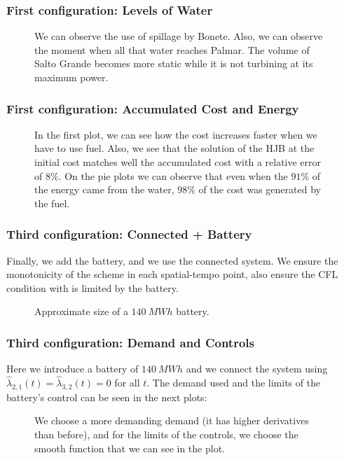 \documentclass[aspectratio=169]{beamer}\usepackage[utf8]{inputenc}
\begin{document}
\begin{frame}\frametitle{First configuration: Levels of Water}
\begin{figure}[ht!]
\centering
{}
\caption{We can observe the use of spillage by Bonete. Also, we can observe the moment when all that water reaches Palmar. The volume of Salto Grande becomes more static while it is not turbining at its maximum power.}
\end{figure}
\end{frame}

\begin{frame}\frametitle{First configuration: Accumulated Cost and Energy}
\begin{figure}[ht!]
\centering
{}
\caption{In the first plot, we can see how the cost increases faster when we have to use fuel. Also, we see that the solution of the HJB at the initial cost matches well the accumulated cost with a relative error of 8\%. On the pie plots we can observe that even when the $91\%$ of the energy came from the water, $98\%$ of the cost was generated by the fuel.}
\end{figure}
\end{frame}

\begin{frame}\frametitle{Third configuration: Connected + Battery}
Finally, we add the battery, and we use the connected system. We ensure the monotonicity of the scheme in each spatial-tempo point, also ensure the CFL condition with is limited by the battery.
\begin{figure}[ht!]
\centering
{}
\caption{Approximate size of a $\SI{140}{MWh}$ battery.}
\end{figure}
\end{frame}

\begin{frame}\frametitle{Third configuration: Demand and Controls}
Here we introduce a battery of $\SI{140}{MWh}$ and we connect the system using $\hat{\lambda}_{2,1}(t)=\hat{\lambda}_{3,2}(t)=0$ for all $t$. The demand used and the limits of the battery's control can be seen in the next plots:
\begin{figure}[ht!]
\centering
{}
\caption{We choose a more demanding demand (it has higher derivatives than before), and for the limits of the controls, we choose the smooth function that we can see in the plot.}
\end{figure}
\end{frame}
\end{document}
